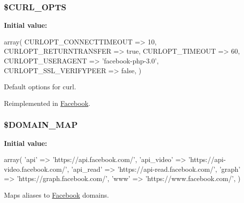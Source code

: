 \hypertarget{class_base_facebook_af857bf8aaa1bbaf0798c8e44eeb05455}{
\subsubsection[{\$\-C\-U\-R\-L\-\_\-\-O\-P\-T\-S}]{\setlength{\rightskip}{0pt plus 5cm}\$C\-U\-R\-L\-\_\-\-O\-P\-T\-S\hspace{0.3cm}{\ttfamily [static]}}}\label{class_base_facebook_af857bf8aaa1bbaf0798c8e44eeb05455}
{\bfseries Initial value\-:}
\begin{DoxyCode}
 array(
    CURLOPT\_CONNECTTIMEOUT => 10,
    CURLOPT\_RETURNTRANSFER => \textcolor{keyword}{true},
    CURLOPT\_TIMEOUT        => 60,
    CURLOPT\_USERAGENT      => \textcolor{stringliteral}{'facebook-php-3.0'},
    CURLOPT\_SSL\_VERIFYPEER      => \textcolor{keyword}{false}, 
  )
\end{DoxyCode}
Default options for curl. 

Reimplemented in \hyperlink{class_facebook_af857bf8aaa1bbaf0798c8e44eeb05455}{Facebook}.

\hypertarget{class_base_facebook_a3d9af40cffd892f8e26b26464188297d}{
\subsubsection[{\$\-D\-O\-M\-A\-I\-N\-\_\-\-M\-A\-P}]{\setlength{\rightskip}{0pt plus 5cm}\$D\-O\-M\-A\-I\-N\-\_\-\-M\-A\-P\hspace{0.3cm}{\ttfamily [static]}}}\label{class_base_facebook_a3d9af40cffd892f8e26b26464188297d}
{\bfseries Initial value\-:}
\begin{DoxyCode}
 array(
    \textcolor{stringliteral}{'api'}       => \textcolor{stringliteral}{'https://api.facebook.com/'},
    \textcolor{stringliteral}{'api\_video'} => \textcolor{stringliteral}{'https://api-video.facebook.com/'},
    \textcolor{stringliteral}{'api\_read'}  => \textcolor{stringliteral}{'https://api-read.facebook.com/'},
    \textcolor{stringliteral}{'graph'}     => \textcolor{stringliteral}{'https://graph.facebook.com/'},
    \textcolor{stringliteral}{'www'}       => \textcolor{stringliteral}{'https://www.facebook.com/'},
  )
\end{DoxyCode}
Maps aliases to \hyperlink{class_facebook}{Facebook} domains. 

